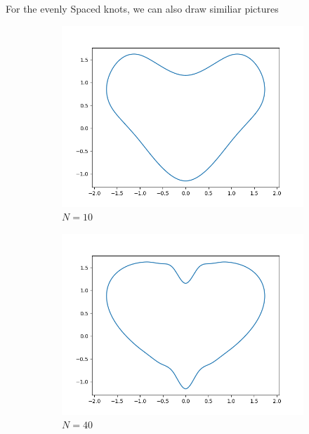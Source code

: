 \documentclass[a4paper]{article}
\begin{document}
For the evenly Spaced knots, we can also draw similiar pictures
\begin{figure}[H]
    \centering
    \begin{subfigure}[b]{0.35\textwidth}
        \centering
        \includegraphics[width=\textwidth]{../figure/E_heart_PP10.png}
        \caption{$N = 10$}
    \end{subfigure}
    \begin{subfigure}[b]{0.35\textwidth}
        \centering
        \includegraphics[width=\textwidth]{../figure/E_heart_PP40.png}
        \caption{$N = 40$}
    \end{subfigure}
    \\ 
    \begin{subfigure}[b]{0.35\textwidth}

\end{subfigure}
\end{figure}
\end{document}
